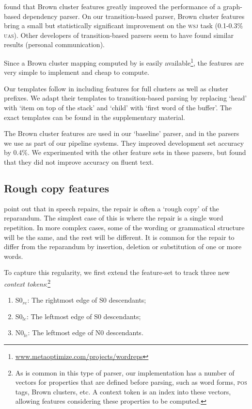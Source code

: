 \documentclass[11pt,letterpaper]{article}
\newcommand{\szero}{S0\xspace}
\newcommand{\nzero}{N0\xspace}
\newcommand{\szeroRedge}{S0$_{re}$\xspace}
\newcommand{\szeroLedge}{S0$_{le}$\xspace}
\newcommand{\nzeroLedge}{N0$_{le}$\xspace}
\begin{document}
\citet{koo:10} found that Brown cluster features greatly improved the performance
of a graph-based dependency parser. On our transition-based parser, Brown cluster
features bring a small but statistically significant improvement on the \textsc{wsj}
task (0.1-0.3\% \textsc{uas}).  Other developers of transition-based parsers
seem to have found similar results (personal communication).

Since a Brown cluster mapping computed by \citet{liang:05} is easily
available\footnote{\url{www.metaoptimize.com/projects/wordreps}}, the features
are very simple to implement and cheap to compute.

Our templates follow \citet{koo:10} in including features for full clusters as
well as cluster prefixes. We adapt their templates to transition-based parsing
by replacing `head' with `item on top of the stack' and `child' with `first word
of the buffer'. The exact templates can be found in the supplementary material.

The Brown cluster features are used in our `baseline' parser, and in the parsers
we use as part of our pipeline systems. They improved development set accuracy
by 0.4\%.  We experimented with the other feature sets in these parsers, but found
that they did not improve accuracy on fluent text.

\subsection{Rough copy features}

\citet{Johnson04a} point out that in speech repairs, the repair is often a `rough
copy' of the reparandum.  The simplest case of this is where the repair is a single
word repetition. In more complex cases, some of the wording or grammatical
structure will be the same, and the rest will be different.  
It is common for the repair to differ from the reparandum by insertion, deletion
or substitution of one or more words.

To capture this regularity, we first extend the feature-set to track three new
\emph{context tokens}:\footnote{As is common
in this type of parser, our implementation has a number of vectors for properties
that are defined before parsing, such as word forms, \textsc{pos} tags, Brown
clusters, etc. A context token is an index into these vectors, allowing
features considering these properties to be computed.}
\begin{enumerate}
    \itemsep0em
    \item \szeroRedge : The rightmost edge of \szero  descendants;
    \item \szeroLedge : The leftmost edge of \szero  descendants;
    \item \nzeroLedge : The leftmost edge of \nzero  descendants.
\end{enumerate}
\end{document}
